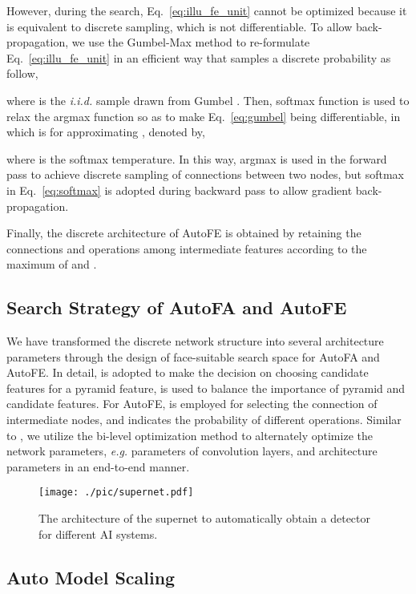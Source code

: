 \documentclass[sigconf]{acmart}
\begin{document}
However, during the search, Eq.~\ref{eq:illu_fe_unit} cannot be optimized because it is equivalent to discrete sampling, which is not differentiable. To allow back-propagation, we use the Gumbel-Max method \cite{dong2019gdas} to re-formulate Eq.~\ref{eq:illu_fe_unit} in an efficient way that samples a discrete probability as follow,

where  is the \textit{i.i.d.} sample drawn from Gumbel \cite{dong2019gdas}. Then, softmax function is used to relax the argmax function so as to make Eq.~\ref{eq:gumbel} being differentiable, in which  is for approximating , denoted by,

where  is the softmax temperature. In this way, argmax is used in the forward pass to achieve discrete sampling of connections between two nodes, but softmax in Eq.~\ref{eq:softmax} is adopted during backward pass to allow gradient back-propagation.

Finally, the discrete architecture of AutoFE is obtained by retaining the connections and operations among intermediate features according to the maximum of  and .

\subsection{Search Strategy of AutoFA and AutoFE}
We have transformed the discrete network structure into several architecture parameters through the design of face-suitable search space for AutoFA and AutoFE. In detail,  is adopted to make the decision on choosing candidate features for a pyramid feature,  is used to balance the importance of pyramid and candidate features. For AutoFE,  is employed for selecting the connection of intermediate nodes, and  indicates the probability of different operations. Similar to \cite{liu2018darts,chen2019pdarts,xu2019pcdarts}, we utilize the bi-level optimization method to alternately optimize the network parameters, \textit{e.g.} parameters of convolution layers, and architecture parameters in an end-to-end manner.

\begin{figure}[!t]
    \centering
    \texttt{[image: ./pic/supernet.pdf]}
    \caption{The architecture of the supernet to automatically obtain a detector for different AI systems.}
    \label{fig:arch_supernet}
\end{figure}

\subsection{Auto Model Scaling}
\end{document}
